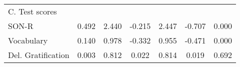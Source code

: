 \begin{table}[!htbp]
\begin{threeparttable}
\begin{tabular}[t]{lcccccc}
			C. Test scores &&&&&&           \\
			\hspace{4mm}SON-R & 0.492 & 2.440 & -0.215 & 2.447 & -0.707 & 0.000\\
			\hspace{4mm}Vocabulary & 0.140 & 0.978 & -0.332 & 0.955 & -0.471 & 0.000\\
			\hspace{4mm}Del. Gratification & 0.003 & 0.812 & 0.022 & 0.814 & 0.019 & 0.692\\

\end{tabular}
\end{threeparttable}
\end{table}
